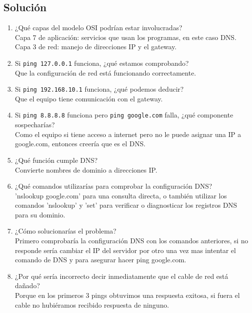 \subsection*{Solución}
\begin{enumerate}[label=\arabic*., leftmargin=*]
    \item ¿Qué capas del modelo OSI podrían estar involucradas?\\
    Capa 7 de aplicación: servicios que usan los programas, en este caso DNS.\\
    Capa 3 de red: manejo de direcciones IP y el gateway.

    \item Si \texttt{ping 127.0.0.1} funciona, ¿qué estamos comprobando?\\
    Que la configuraci\'on de red est\'a funcionando correctamente.

    \item Si \texttt{ping 192.168.10.1} funciona, ¿qué podemos deducir?\\
    Que el equipo tiene comunicaci\'on con el gateway.

    \item Si \texttt{ping 8.8.8.8} funciona pero \texttt{ping google.com} falla, ¿qué componente sospecharías?\\
    Como el equipo si tiene acceso a internet pero no le puede asignar una IP a google.com, entonces creer\'ia que es el DNS.

    \item ¿Qué función cumple DNS?\\
    Convierte nombres de dominio a direcciones IP.

    \item ¿Qué comandos utilizarías para comprobar la configuración DNS?\\
    'nslookup google.com' para una consulta directa, o tambi\'en utilizar los comandos 'nslookup' y 'set' para
     verificar o diagnosticar los registros DNS para su dominio.

    \item ¿Cómo solucionarías el problema?\\
    Primero comprobaría la configuración DNS con los comandos anteriores, si no responde sería cambiar el IP del servidor por otro
    una vez mas intentar el comando de DNS y para asegurar hacer ping google.com.

    \item ¿Por qué sería incorrecto decir inmediatamente que el cable de red está dañado?\\
    Porque en los primeros 3 pings obtuvimos una respuesta exitosa, si fuera el cable no hubi\'eramos recibido respuesta de ninguno.


\end{enumerate}
